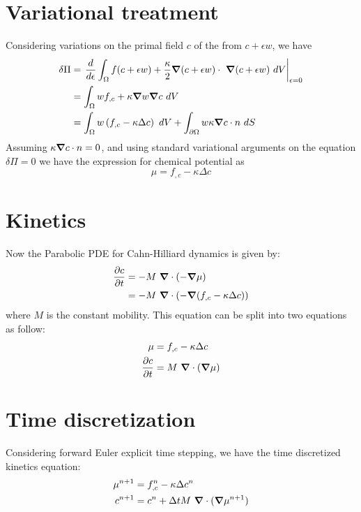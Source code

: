 \documentclass[10pt]{article}
\newcommand{\gv}[1]{\ensuremath{\mbox{\boldmath$ #1 $}}}
\newcommand{\grad}[1]{\gv{\nabla} #1}
\begin{document}
\section{Variational treatment}
Considering variations on the primal field $c$ of the from $c+\epsilon w$, we have
\begin{align}
\delta \Pi &=  \left. \frac{d}{d\epsilon} \int_{\Omega}  f(c+\epsilon w) +  \frac{\kappa}{2} \grad  (c+\epsilon w)  \cdot  ~\grad  (c+\epsilon w)   ~dV \right\vert_{\epsilon=0} \\
&=  \int_{\Omega}   w f_{,c} +   \kappa \grad w \grad  c    ~dV \\
&=  \int_{\Omega}   w \left( f_{,c} -  \kappa \Delta c \right)  ~dV  +   \int_{\partial \Omega}   w \kappa \grad c \cdot n   ~dS
\end{align}
Assuming $\kappa \grad c \cdot n = 0$, and using standard variational arguments on the equation $\delta \Pi =0$ we have the expression for chemical potential as
\begin{equation}
  \mu  = f_{,c} -  \kappa \Delta c
\end{equation}

\section{Kinetics}
Now the Parabolic PDE for Cahn-Hilliard dynamics is given by:
\begin{align}
  \frac{\partial c}{\partial t} &= -M~\grad \cdot (-\grad \mu)\\
  &=-M~\grad \cdot (-\grad (f_{,c} -  \kappa \Delta c)) 
\end{align}
where $M$ is the constant mobility. This equation can be split into two equations as follow:
\begin{align}
  \mu &= f_{,c} -  \kappa \Delta c \\
  \frac{\partial c}{\partial t} &= M~\grad \cdot (\grad \mu)
\end{align}
\section{Time discretization}
Considering forward Euler explicit time stepping, we have the time discretized kinetics equation:
\begin{align}
  \mu^{n+1} &= f_{,c}^{n} -  \kappa \Delta c^{n} \\
 c^{n+1} &= c^{n} + \Delta t M~\grad \cdot (\grad \mu^{n+1})
\end{align}
\end{document}
